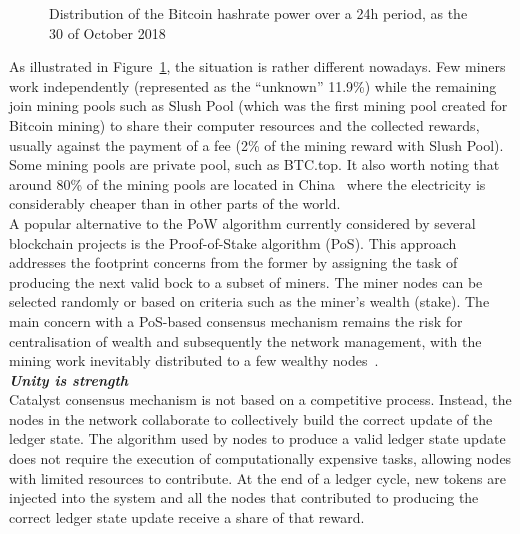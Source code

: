 \begin{figure}[H]
\caption{\label{fig:pools} Distribution of the Bitcoin hashrate power over a 24h period, as the 30 of October 2018\cite{bc24}}
\end{figure}

As illustrated in Figure~\ref{fig:pools}, the situation is rather different nowadays. Few miners work independently (represented as the “unknown” 11.9\%) while the remaining join mining pools such as Slush Pool (which was the first mining pool created for Bitcoin mining) to share their computer resources and the collected rewards, usually against the payment of a fee (2\% of the mining reward with Slush Pool). Some mining pools are private pool, such as BTC.top. It also worth noting that around 80\% of the mining pools are located in China~\cite{poolcent} where the electricity is considerably cheaper than in other parts of the world. \\

A popular alternative to the PoW algorithm currently considered by several blockchain projects is the Proof-of-Stake algorithm (PoS). This approach addresses the footprint concerns from the former by assigning the task of producing the next valid bock to a subset of miners. The miner nodes can be selected randomly or based on criteria such as the miner’s wealth (stake). The main concern with a PoS-based consensus mechanism remains the risk for centralisation of wealth and subsequently the network management, with the mining work inevitably distributed to a few wealthy nodes~\cite{PoSr}.\\

\textbf{\textit{Unity is strength}}\\
Catalyst consensus mechanism is not based on a competitive process. Instead, the nodes in the network collaborate to collectively build the correct update of the ledger state. The algorithm used by nodes to produce a valid ledger state update does not require the execution of computationally expensive tasks, allowing nodes with limited resources to contribute. At the end of a ledger cycle, new tokens are injected into the system and all the nodes that contributed to producing the correct ledger state update receive a share of that reward.

